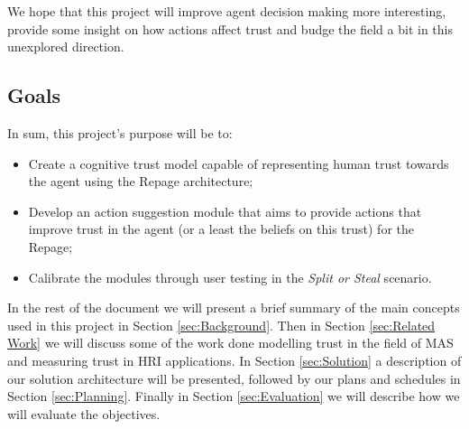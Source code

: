 We hope that this project will improve agent decision making more interesting, provide some insight on how actions affect trust and budge the field a bit in this unexplored direction.


\subsection{Goals}
\label{subsec:Goals}

In sum, this project's purpose will be to:
\begin{itemize}
	\item Create a cognitive trust model capable of representing human trust towards the agent using the Repage architecture;
	\item Develop an action suggestion module that aims to provide actions that improve trust in the agent (or a least the beliefs on this trust) for the Repage;
	\item Calibrate the modules through user testing in the \textit{Split or Steal} scenario.
\end{itemize}


In the rest of the document we will present a brief summary of the main concepts used in this project in Section  \ref{sec:Background}. Then in Section \ref{sec:Related Work} we will discuss some of the work done modelling trust in the field of \ac{MAS} and measuring trust in \ac{HRI} applications. In Section \ref{sec:Solution} a description of our solution architecture will be presented, followed by our plans and schedules in Section \ref{sec:Planning}. Finally in Section \ref{sec:Evaluation} we will describe how we will evaluate the objectives.



